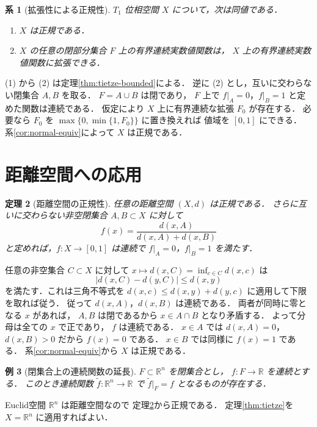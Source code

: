 \documentclass[a5paper,10pt,onecolumn]{jsarticle}
\makeatletter
\theoremstyle{mathnotetheorem}
\newtheorem{theorem}{定理}[section]
\newtheorem{corollary}[theorem]{系}
\newtheorem{example}[theorem]{例}
\renewcommand{\proofname}{証明}
\renewenvironment{proof}[1][\proofname]{%
  \par\pushQED{\qed}\normalfont\topsep4\p@\@plus2\p@\relax
  \trivlist\item[\hskip\labelsep\bfseries #1]\ignorespaces
}{\popQED\endtrivlist\@endpefalse}
\makeatother
\begin{document}
\begin{corollary}[拡張性による正規性]\label{cor:tietze-normal}
$T_1$ 位相空間 $X$ について，次は同値である．
\begin{enumerate}
\item $X$ は正規である．
\item $X$ の任意の閉部分集合 $F$ 上の有界連続実数値関数は，
$X$ 上の有界連続実数値関数に拡張できる．
\end{enumerate}
\end{corollary}
\begin{proof}
(1) から (2) は定理\ref{thm:tietze-bounded}による．
逆に (2) とし，互いに交わらない閉集合 $A,B$ を取る．
$F=A\cup B$ は閉であり，
$F$ 上で $f|_A=0$，$f|_B=1$ と定めた関数は連続である．
仮定により $X$ 上に有界連続な拡張 $F_0$ が存在する．
必要なら $F_0$ を
$\max\{0,\min\{1,F_0\}\}$ に置き換えれば
値域を $[0,1]$ にできる．
系\ref{cor:normal-equiv}によって $X$ は正規である．
\end{proof}

\section{距離空間への応用}

\begin{theorem}[距離空間の正規性]\label{thm:metric-normal}
任意の距離空間 $(X,d)$ は正規である．
さらに互いに交わらない非空閉集合 $A,B\subset X$ に対して
\[
 f(x)=\frac{d(x,A)}{d(x,A)+d(x,B)}
\]
と定めれば，$f:X\to[0,1]$ は連続で
$f|_A=0$，$f|_B=1$ を満たす．
\end{theorem}
\begin{proof}
任意の非空集合 $C\subset X$ に対して
$x\mapsto d(x,C)=\inf_{c\in C}d(x,c)$ は
\[
 |d(x,C)-d(y,C)|\le d(x,y)
\]
を満たす．これは三角不等式を
$d(x,c)\le d(x,y)+d(y,c)$ に適用して下限を取れば従う．
従って $d(x,A)$，$d(x,B)$ は連続である．
両者が同時に零となる $x$ があれば，
$A,B$ は閉であるから $x\in A\cap B$ となり矛盾する．
よって分母は全ての $x$ で正であり，
$f$ は連続である．
$x\in A$ では $d(x,A)=0$，$d(x,B)>0$ だから
$f(x)=0$ である．
$x\in B$ では同様に $f(x)=1$ である．
系\ref{cor:normal-equiv}から $X$ は正規である．
\end{proof}

\begin{example}[閉集合上の連続関数の延長]
$F\subset\mathbb R^n$ を閉集合とし，
$f:F\to\mathbb R$ を連続とする．
このとき連続関数
$\widetilde f:\mathbb R^n\to\mathbb R$ で
$\widetilde f|_F=f$ となるものが存在する．
\end{example}
\begin{proof}
Euclid空間 $\mathbb R^n$ は距離空間なので
定理\ref{thm:metric-normal}から正規である．
定理\ref{thm:tietze}を $X=\mathbb R^n$ に適用すればよい．
\end{proof}
\end{document}
